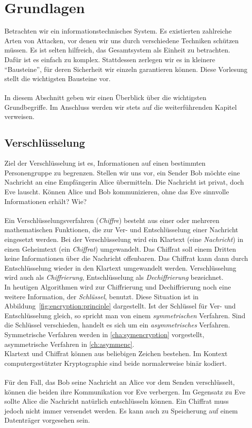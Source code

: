 \section{Grundlagen}
Betrachten wir ein informationstechnisches System. Es existierten zahlreiche Arten von Attacken, vor denen wir uns durch verschiedene Techniken schützen müssen. Es ist selten hilfreich, das Gesamtsystem als Einheit zu betrachten. Dafür ist es einfach zu komplex. Stattdessen zerlegen wir es in kleinere "`Bausteine"', für deren Sicherheit wir einzeln garantieren können. Diese Vorlesung stellt die wichtigsten Bausteine vor.\\ \ \\
In diesem Abschnitt geben wir einen Überblick über die wichtigsten Grundbegriffe. Im Anschluss werden wir stets auf die weiterführenden Kapitel verweisen.

\subsection{Verschlüsselung}

Ziel der Verschlüsselung ist es, Informationen auf einen bestimmten Personengruppe zu begrenzen. Stellen wir uns vor, ein Sender Bob möchte eine Nachricht an eine Empfängerin Alice übermitteln. Die Nachricht ist privat, doch Eve lauscht. Können Alice und Bob kommunizieren, ohne das Eve sinnvolle Informationen erhält? Wie?\\ \ \\
Ein Verschlüsselungsverfahren (\emph{Chiffre}) besteht aus einer oder mehreren mathematischen Funktionen, die zur Ver- und Entschlüsselung einer Nachricht eingesetzt werden. Bei der Verschlüsselung wird ein Klartext (eine \emph{Nachricht}) in einen Geheimtext (ein \emph{Chiffrat}) umgewandelt. Das Chiffrat soll einem Dritten keine Informationen über die Nachricht offenbaren. Das Chiffrat kann dann durch Entschlüsselung wieder in den Klartext umgewandelt werden. Verschlüsselung wird auch als \emph{Chiffrierung}, Entschlüsselung als \emph{Dechiffrierung} bezeichnet.\\
In heutigen Algorithmen wird zur Chiffrierung und Dechiffrierung noch eine weitere Information, der \emph{Schlüssel}, benutzt. Diese Situation ist in Abbildung~\ref{fig:encryption:principle} dargestellt. Ist der Schlüssel für Ver- und Entschlüsselung gleich, so spricht man von einem \emph{symmetrischen} Verfahren. Sind die Schlüssel verschieden, handelt es sich um ein \emph{asymmetrisches} Verfahren. Symmetrische Verfahren werden in \autoref{cha:symencryption} vorgestellt, asymmetrische Verfahren in \autoref{ch:asymmenc}.\\
Klartext und Chiffrat können aus beliebigen Zeichen bestehen. Im Kontext computergestützter Kryptographie sind beide normalerweise binär kodiert.\\ \ \\
Für den Fall, das Bob seine Nachricht an Alice vor dem Senden verschlüsselt, können die beiden ihre Kommunikation vor Eve verbergen. Im Gegensatz zu Eve sollte Alice die Nachricht natürlich entschlüsseln können. Ein Chiffrat muss jedoch nicht immer versendet werden. Es kann auch zu Speicherung auf einem Datenträger vorgesehen sein.

